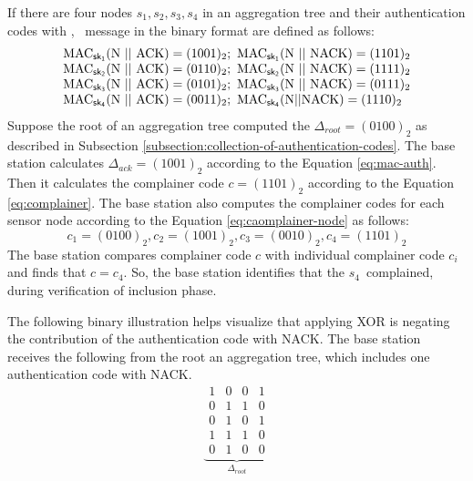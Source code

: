		\begin{exmp} 
			If there are four nodes ${s_{1},s_{2},s_{3},s_{4}}$ in an aggregation tree and their authentication codes with \ack, \nack\ message in the binary format are defined as follows:
			\begin{equation*}
				\begin{array}{l}
					\mbox{MAC}_{\sf{sk}_{1}}(\mbox{N}\ ||\ \mbox{ACK}) = (1001)_{2};\ \mbox{MAC}_{\sf{sk}_{1}}(\mbox{N}\ ||\ \mbox{NACK}) = (1101)_{2}\\
					\mbox{MAC}_{\sf{sk}_{2}}(\mbox{N}\ ||\ \mbox{ACK}) = (0110)_{2};\ \mbox{MAC}_{\sf{sk}_{2}}(\mbox{N}\ ||\ \mbox{NACK}) = (1111)_{2}\\	
					\mbox{MAC}_{\sf{sk}_{3}}(\mbox{N}\ ||\ \mbox{ACK}) = (0101)_{2};\ \mbox{MAC}_{\sf{sk}_{3}}(\mbox{N}\ ||\ \mbox{NACK}) = (0111)_{2}\\
					\mbox{MAC}_{\sf{sk}_{4}}(\mbox{N}\ ||\ \mbox{ACK}) = (0011)_{2};\ \mbox{MAC}_{\sf{sk}_{4}}(\mbox{N} || \mbox{NACK}) = (1110)_{2}
				\end{array}
			\end{equation*}
			Suppose the root of an aggregation tree computed the $\Delta_{root} = (0100)_{2}$ as described in Subsection \ref{subsection:collection-of-authentication-codes}.
			The base station calculates $\Delta_{ack} = (1001)_{2}$ according to the Equation \ref{eq:mac-auth}.
			Then it calculates the complainer code $c = (1101)_{2}$ according to the Equation \ref{eq:complainer}.
			The base station also computes the complainer codes for each sensor node according to the Equation \ref{eq:caomplainer-node} as follows:
			\begin{equation*}			
				c_{1} = (0100)_{2}, c_{2} = (1001)_{2}, c_{3} = (0010)_{2}, c_{4} = (1101)_{2}
			\end{equation*}
			The base station compares complainer code $c$ with individual complainer code $c_{i}$ and finds that $c=c_{4}$.
			So, the base station identifies that the $s_{4}$\ complained, during verification of inclusion phase.
		\end{exmp}
		The following binary illustration helps visualize that applying XOR is negating the contribution of the authentication code with NACK.
		The base station receives the following from the root an aggregation tree, which includes one authentication code with NACK.
		\[
			\underbrace{			
				\begin{array}{cccc}
					1 & 0 & 0 & 1 \\ 
					0 & 1 & 1 & 0 \\
					0 & 1 & 0 & 1 \\
					1 & 1 & 1 & 0 \\
					\hline
					0 & 1 & 0 & 0 
				\end{array}
				}_{\Delta_{root}}
		\]
